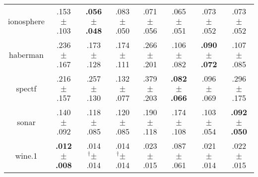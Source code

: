 \begin{tabular}{|c|ccccccc|}
ionosphere & .153$^{\phantom{\dag}}\pm^{\phantom{\dag}}$.103\cellcolor{red!40} & \textbf{.056$^{\phantom{\dag}}\pm^{\phantom{\dag}}$.048}\cellcolor{green!40} & .083$^{\phantom{\dag}}\pm^{\phantom{\dag}}$.050\cellcolor{green!17} & .071$^{\phantom{\dag}}\pm^{\phantom{\dag}}$.056\cellcolor{green!27} & .065$^{\phantom{\dag}}\pm^{\phantom{\dag}}$.051\cellcolor{green!32} & .073$^{\phantom{\dag}}\pm^{\phantom{\dag}}$.052\cellcolor{green!25} & .073$^{\phantom{\dag}}\pm^{\phantom{\dag}}$.052\cellcolor{green!25} \\
haberman & .236$^{\phantom{\dag}}\pm^{\phantom{\dag}}$.167\cellcolor{red!26} & .173$^{\phantom{\dag}}\pm^{\phantom{\dag}}$.128\cellcolor{green!2} & .174$^{\phantom{\dag}}\pm^{\phantom{\dag}}$.111\cellcolor{green!1} & .266$^{\phantom{\dag}}\pm^{\phantom{\dag}}$.201\cellcolor{red!40} & .106$^{\phantom{\dag}}\pm^{\phantom{\dag}}$.082\cellcolor{green!32} & \textbf{.090$^{\phantom{\dag}}\pm^{\phantom{\dag}}$.072}\cellcolor{green!40} & .107$^{\phantom{\dag}}\pm^{\phantom{\dag}}$.085\cellcolor{green!32} \\
spectf & .216$^{\phantom{\dag}}\pm^{\phantom{\dag}}$.157\cellcolor{green!4} & .257$^{\phantom{\dag}}\pm^{\phantom{\dag}}$.130\cellcolor{red!6} & .132$^{\phantom{\dag}}\pm^{\phantom{\dag}}$.077\cellcolor{green!26} & .379$^{\phantom{\dag}}\pm^{\phantom{\dag}}$.203\cellcolor{red!40} & \textbf{.082$^{\phantom{\dag}}\pm^{\phantom{\dag}}$.066}\cellcolor{green!40} & .096$^{\phantom{\dag}}\pm^{\phantom{\dag}}$.069\cellcolor{green!36} & .296$^{\phantom{\dag}}\pm^{\phantom{\dag}}$.175\cellcolor{red!17} \\
sonar & .140$^{\phantom{\dag}}\pm^{\phantom{\dag}}$.092\cellcolor{green!1} & .118$^{\phantom{\dag}}\pm^{\phantom{\dag}}$.085\cellcolor{green!18} & .120$^{\phantom{\dag}}\pm^{\phantom{\dag}}$.085\cellcolor{green!17} & .190$^{\phantom{\dag}}\pm^{\phantom{\dag}}$.118\cellcolor{red!40} & .174$^{\phantom{\dag}}\pm^{\phantom{\dag}}$.108\cellcolor{red!27} & .103$^{\phantom{\dag}}\pm^{\phantom{\dag}}$.054\cellcolor{green!30} & \textbf{.092$^{\phantom{\dag}}\pm^{\phantom{\dag}}$.050}\cellcolor{green!40} \\
wine.1 & \textbf{.012$^{\phantom{\dag}}\pm^{\phantom{\dag}}$.008}\cellcolor{green!40} & .014$^{\dag}\pm^{\phantom{\dag}}$.014\cellcolor{green!37} & .014$^{\dag}\pm^{\phantom{\dag}}$.014\cellcolor{green!37} & .023$^{\phantom{\dag}}\pm^{\phantom{\dag}}$.015\cellcolor{green!28} & .087$^{\phantom{\dag}}\pm^{\phantom{\dag}}$.061\cellcolor{red!40} & .021$^{\phantom{\dag}}\pm^{\phantom{\dag}}$.014\cellcolor{green!30} & .022$^{\phantom{\dag}}\pm^{\phantom{\dag}}$.015\cellcolor{green!29} \\

\end{tabular}
